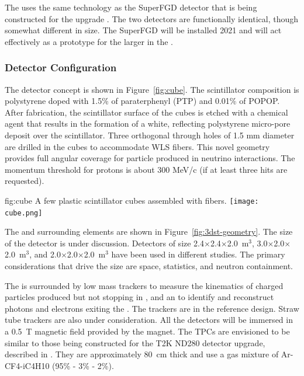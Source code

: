 The  uses the same technology as the SuperFGD detector that is being constructed for the   upgrade \cite{Abe:2019whr}.  The two detectors are functionally identical, though somewhat different in size.  The SuperFGD will be installed 2021 and will act effectively as a prototype for the larger  in the   . 


\subsubsection{Detector Configuration}

The  detector concept is shown in Figure~\ref{fig:cube}.
The scintillator composition is polystyrene doped with 1.5\% of paraterphenyl (PTP) and 0.01\% of POPOP. After fabrication, the scintillator surface of the cubes is etched with a chemical agent that results in the formation of a white, reflecting polystyrene micro-pore deposit over the scintillator. Three orthogonal through holes of 1.5 mm diameter are drilled in the cubes to accommodate WLS fibers. 
This novel geometry provides full angular coverage for particle produced in neutrino interactions.  The momentum threshold for protons is about 300 MeV/c (if at least three hits are requested).



\begin{dunefigure}{fig:cube}
{A few plastic scintillator cubes assembled with  fibers.}
  \texttt{[image: cube.png]}
\end{dunefigure}

The  and surrounding elements are shown in Figure~\ref{fig:3dst-geometry}.  The size of the  detector is under discussion.  Detectors of size 2.4$\times$2.4$\times$2.0~m$^{3}$, 3.0$\times$2.0$\times$2.0~m$^{3}$, and 2.0$\times$2.0$\times$2.0~m$^{3}$ have been used in different studies.  The primary considerations that drive the size are space, statistics, and neutron containment.

The  is surrounded by low mass trackers to measure the kinematics of charged particles produced but not stopping in , and an  to identify and reconstruct photons and electrons exiting the . The trackers are  in the reference design.  Straw tube trackers are also under consideration.  All the detectors will be immersed in a 0.5~T magnetic field provided by the  magnet. The TPCs are envisioned to be similar to those being constructed for the T2K ND280 detector upgrade, described in \cite{Abe:2019whr}.  They are approximately 80~cm thick and use a gas mixture of Ar-CF4-iC4H10 (95\% - 3\% - 2\%).  

